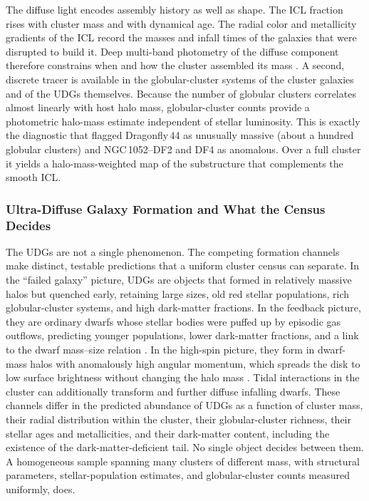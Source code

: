 The diffuse light encodes assembly history as well as shape. The ICL fraction rises with cluster mass and with dynamical age. The radial color and metallicity gradients of the ICL record the masses and infall times of the galaxies that were disrupted to build it. Deep multi-band photometry of the diffuse component therefore constrains when and how the cluster assembled its mass \cite{montes2022review}. A second, discrete tracer is available in the globular-cluster systems of the cluster galaxies and of the UDGs themselves. Because the number of globular clusters correlates almost linearly with host halo mass, globular-cluster counts provide a photometric halo-mass estimate independent of stellar luminosity. This is exactly the diagnostic that flagged Dragonfly\,44 as unusually massive (about a hundred globular clusters) and NGC\,1052--DF2 and DF4 as anomalous. Over a full cluster it yields a halo-mass-weighted map of the substructure that complements the smooth ICL.

\subsubsection{Ultra-Diffuse Galaxy Formation and What the Census Decides}

The UDGs are not a single phenomenon. The competing formation channels make distinct, testable predictions that a uniform cluster census can separate. In the ``failed galaxy'' picture, UDGs are objects that formed in relatively massive halos but quenched early, retaining large sizes, old red stellar populations, rich globular-cluster systems, and high dark-matter fractions. In the feedback picture, they are ordinary dwarfs whose stellar bodies were puffed up by episodic gas outflows, predicting younger populations, lower dark-matter fractions, and a link to the dwarf mass--size relation \cite{dicintio2017}. In the high-spin picture, they form in dwarf-mass halos with anomalously high angular momentum, which spreads the disk to low surface brightness without changing the halo mass \cite{amorisco2016}. Tidal interactions in the cluster can additionally transform and further diffuse infalling dwarfs. These channels differ in the predicted abundance of UDGs as a function of cluster mass, their radial distribution within the cluster, their globular-cluster richness, their stellar ages and metallicities, and their dark-matter content, including the existence of the dark-matter-deficient tail. No single object decides between them. A homogeneous sample spanning many clusters of different mass, with structural parameters, stellar-population estimates, and globular-cluster counts measured uniformly, does.

